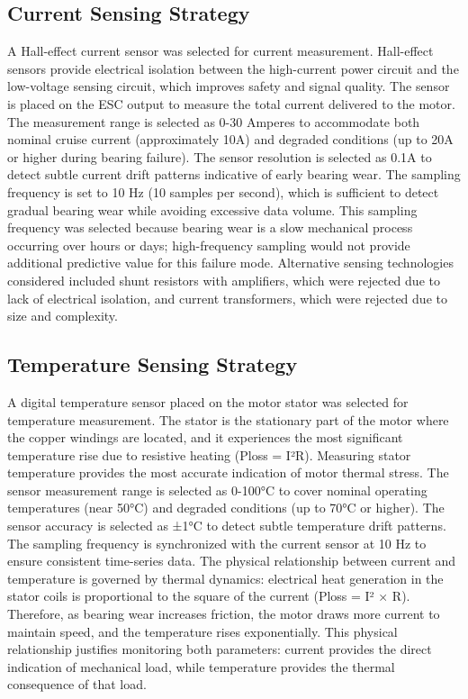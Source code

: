 \subsection{Current Sensing Strategy}

A Hall-effect current sensor was selected for current measurement. Hall-effect sensors provide electrical isolation between the high-current power circuit and the low-voltage sensing circuit, which improves safety and signal quality. The sensor is placed on the ESC output to measure the total current delivered to the motor. The measurement range is selected as 0-30 Amperes to accommodate both nominal cruise current (approximately 10A) and degraded conditions (up to 20A or higher during bearing failure). The sensor resolution is selected as 0.1A to detect subtle current drift patterns indicative of early bearing wear. The sampling frequency is set to 10 Hz (10 samples per second), which is sufficient to detect gradual bearing wear while avoiding excessive data volume. This sampling frequency was selected because bearing wear is a slow mechanical process occurring over hours or days; high-frequency sampling would not provide additional predictive value for this failure mode. Alternative sensing technologies considered included shunt resistors with amplifiers, which were rejected due to lack of electrical isolation, and current transformers, which were rejected due to size and complexity.

\subsection{Temperature Sensing Strategy}

A digital temperature sensor placed on the motor stator was selected for temperature measurement. The stator is the stationary part of the motor where the copper windings are located, and it experiences the most significant temperature rise due to resistive heating (Ploss = I²R). Measuring stator temperature provides the most accurate indication of motor thermal stress. The sensor measurement range is selected as 0-100°C to cover nominal operating temperatures (near 50°C) and degraded conditions (up to 70°C or higher). The sensor accuracy is selected as ±1°C to detect subtle temperature drift patterns. The sampling frequency is synchronized with the current sensor at 10 Hz to ensure consistent time-series data. The physical relationship between current and temperature is governed by thermal dynamics: electrical heat generation in the stator coils is proportional to the square of the current (Ploss = I² × R). Therefore, as bearing wear increases friction, the motor draws more current to maintain speed, and the temperature rises exponentially. This physical relationship justifies monitoring both parameters: current provides the direct indication of mechanical load, while temperature provides the thermal consequence of that load.

